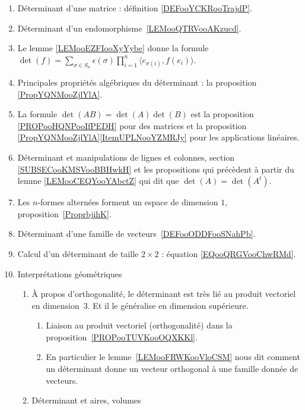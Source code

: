      \label{THMooUXJMooOroxbI}
\begin{enumerate}
	\item
	      Déterminant d'une matrice : définition \ref{DEFooYCKRooTrajdP}.
	\item
	      Déterminant d'un endomorphisme~\ref{LEMooQTRVooAKzucd}.
	\item
	      Le lemme \ref{LEMooEZFIooXyYybe} donne la formule \( \det(f)=\sum_{\sigma\in S_n}\epsilon(\sigma)\prod_{i=1}^n\langle e_{\sigma(i)}, f(e_i)\rangle\).
	\item
	      Principales propriétés algébriques du déterminant : la proposition \ref{PropYQNMooZjlYlA}.
	\item
	      La formule \( \det(AB)=\det(A)\det(B)\) est la proposition \ref{PROPooHQNPooIfPEDH} pour des matrices et la proposition \ref{PropYQNMooZjlYlA}\ref{ItemUPLNooYZMRJy} pour les applications linéaires.
	\item
	      Déterminant et manipulations de lignes et colonnes, section \ref{SUBSECooKMSVooBBHwkH} et les propositions qui précèdent à partir du lemme \ref{LEMooCEQYooYAbctZ} qui dit que \( \det(A)=\det(A^t)\).
	\item
	      Les \( n\)-formes alternées forment un espace de dimension \( 1\), proposition~\ref{ProprbjihK}.
	\item
	      Déterminant d'une famille de vecteurs~\ref{DEFooODDFooSNahPb}.
	\item
	      Calcul d'un déterminant de taille \( 2\times 2\) : équation \eqref{EQooQRGVooChwRMd}.
	\item
	      Interprétations géométriques
	      \begin{enumerate}
		      \item
		            À propos d'orthogonalité, le déterminant est très lié au produit vectoriel en dimension~\( 3\). Et il le généralise en dimension supérieure.
		            \begin{enumerate}
			            \item
			                  Liaison au produit vectoriel (orthogonalité) dans la proposition~\ref{PROPooTUVKooOQXKKl}.
			            \item
			                  En particulier le lemme~\ref{LEMooFRWKooVloCSM} nous dit comment un déterminant donne un vecteur orthogonal à une famille donnée de vecteurs.
		            \end{enumerate}
		      \item
		            Déterminant et aires, volumes

\end{enumerate}
\end{enumerate}
